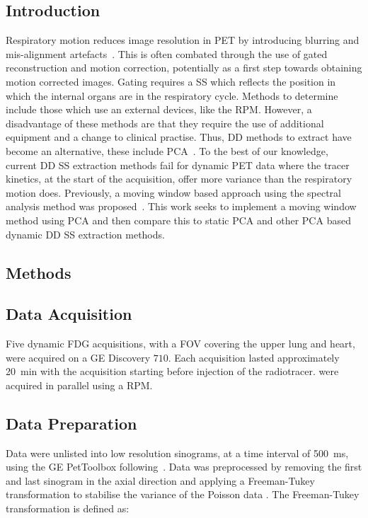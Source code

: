         \subsection{Introduction} \label{sec:pca_data_driven_surrogate_signal_extraction_methods_for_dynamic_pet_introduction}
            Respiratory motion reduces image resolution in \gls{PET} by introducing blurring and mis-alignment artefacts~. This is often combated through the use of gated reconstruction and motion correction, potentially as a first step towards obtaining motion corrected images. Gating requires a \gls{SS} which reflects the position in which the internal organs are in the respiratory cycle. Methods to determine  include those which use an external devices, like the \gls{RPM}. However, a disadvantage of these methods are that they require the use of additional equipment and a change to clinical practise. Thus, \gls{DD} methods to extract  have become an alternative, these include \gls{PCA}~. To the best of our knowledge, current \gls{DD} \gls{SS} extraction methods fail for dynamic \gls{PET} data where the tracer kinetics, at the start of the acquisition, offer more variance than the respiratory motion does. Previously, a moving window based approach using the spectral analysis method was proposed~. This work seeks to implement a moving window method using \gls{PCA} and then compare this to static \gls{PCA} and other \gls{PCA} based dynamic \gls{DD} \gls{SS} extraction methods.
        
        \subsection{Methods} \label{sec:pca_data_driven_surrogate_signal_extraction_methods_for_dynamic_pet_methods}
            \subsection{Data Acquisition} \label{sec:pca_data_driven_surrogate_signal_extraction_methods_for_dynamic_pet_methods_data_acquisition}
                Five dynamic \gls{FDG} acquisitions, with a \gls{FOV} covering the upper lung and heart, were acquired on a \gls{GE} Discovery $710$. Each acquisition lasted approximately \SI{20}{\minute} with the acquisition starting before injection of the radiotracer.  were acquired in parallel using a \gls{RPM}.
                
            \subsection{Data Preparation} \label{sec:pca_data_driven_surrogate_signal_extraction_methods_for_dynamic_pet_methods_data_preparation}
                Data were unlisted into low resolution sinograms, at a time interval of \SI{500}{\milli\second}, using the \gls{GE} PetToolbox following~. Data was preprocessed by removing the first and last sinogram in the axial direction and applying a Freeman-Tukey transformation to stabilise the variance of the Poisson data . The Freeman-Tukey transformation is defined as:

